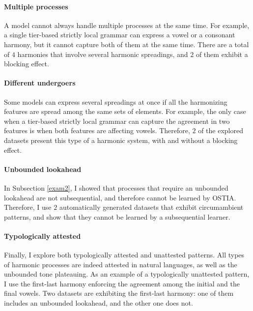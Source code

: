 \paragraph{Multiple processes}
A model cannot always handle multiple processes at the same time.
For example, a single tier-based strictly local grammar can express a vowel or a consonant harmony, but it cannot capture both of them at the same time.
There are a total of $4$ harmonies that involve several harmonic spreadings, and $2$ of them exhibit a blocking effect.


\paragraph{Different undergoers}
Some models can express several spreadings at once if all the harmonizing features are spread among the same sets of elements.
For example, the only case when a tier-based strictly local grammar can capture the agreement in two features is when both features are affecting vowels.
Therefore, $2$ of the explored datasets present this type of a harmonic system, with and without a blocking effect.

\paragraph{Unbounded lookahead}
In Subsection \ref{exam2}, I showed that processes that require an unbounded lookahead are not subsequential, and therefore cannot be learned by OSTIA.
Therefore, I use $2$ automatically generated datasets that exhibit circumambient patterns, and show that they cannot be learned by a subsequential learner.

\paragraph{Typologically attested}
Finally, I explore both typologically attested and unattested patterns.
All types of harmonic processes are indeed attested in natural languages, as well as the unbounded tone plateauing.
As an example of a typologically unattested pattern, I use the first-last harmony enforcing the agreement among the initial and the final vowels.
Two datasets are exhibiting the first-last harmony: one of them includes an unbounded lookahead, and the other one does not.


